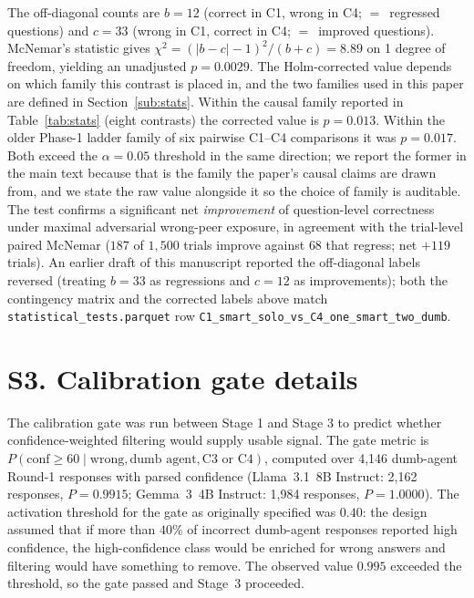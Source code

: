 \documentclass[11pt]{article}
\begin{document}
The off-diagonal counts are $b = 12$ (correct in C1, wrong in C4;
$=$~regressed questions) and $c = 33$ (wrong in C1, correct in C4;
$=$~improved questions).
McNemar's statistic gives $\chi^2 = (|b - c| - 1)^2 / (b + c) = 8.89$ on
1 degree of freedom, yielding an unadjusted $p = 0.0029$.
The Holm-corrected value depends on which family this contrast is placed in,
and the two families used in this paper are defined in
Section~\ref{sub:stats}.
Within the causal family reported in Table~\ref{tab:stats} (eight contrasts)
the corrected value is $p = 0.013$.
Within the older Phase-1 ladder family of six pairwise C1--C4 comparisons it
was $p = 0.017$.
Both exceed the $\alpha = 0.05$ threshold in the same direction; we report the
former in the main text because that is the family the paper's causal claims
are drawn from, and we state the raw value alongside it so the choice of family
is auditable.
The test confirms a significant net \emph{improvement} of
question-level correctness under maximal adversarial wrong-peer
exposure, in agreement with the trial-level paired McNemar
($187$ of $1{,}500$ trials improve against $68$ that regress; net
$+119$ trials).
An earlier draft of this manuscript reported the off-diagonal
labels reversed (treating $b = 33$ as regressions and $c = 12$ as
improvements); both the contingency matrix and the corrected labels
above match \texttt{statistical\_tests.parquet} row
\texttt{C1\_smart\_solo\_vs\_C4\_one\_smart\_two\_dumb}.

\section*{S3. Calibration gate details}
\label{ssec:calibration}

The calibration gate was run between Stage 1 and Stage 3 to predict
whether confidence-weighted filtering would supply usable signal.
The gate metric is
$P(\text{conf} \geq 60 \mid \text{wrong}, \text{dumb agent}, \text{C3
or C4})$, computed over 4{,}146 dumb-agent Round-1 responses with
parsed confidence (Llama~3.1~8B Instruct: 2{,}162 responses,
$P = 0.9915$; Gemma~3~4B Instruct: 1{,}984 responses, $P = 1.0000$).
The activation threshold for the gate as originally specified was
$0.40$: the design assumed that if more than $40\%$ of incorrect
dumb-agent responses reported high confidence, the high-confidence
class would be enriched for wrong answers and filtering would have
something to remove.
The observed value $0.995$ exceeded the threshold, so the gate passed
and Stage~3 proceeded.
\end{document}
